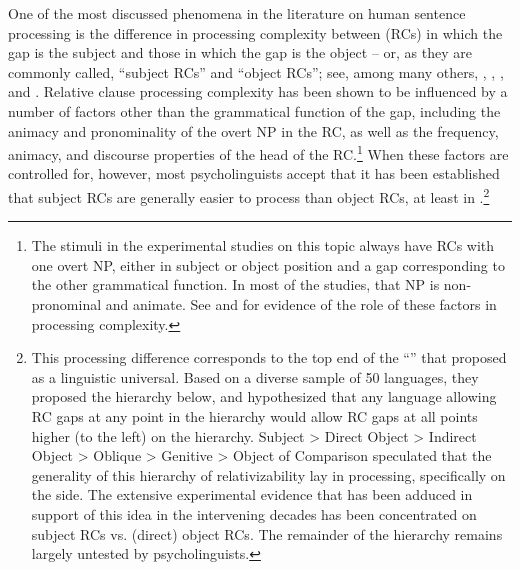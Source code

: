 \documentclass[output=paper
 	        ,biblatex
                ,babelshorthands
                ,newtxmath
                ,draftmode
                ,colorlinks, citecolor=brown
]{langscibook}
\begin{document}
One of the most discussed phenomena in the literature on human sentence processing is the difference in processing complexity between  (RCs) in which the gap is the subject and those in which the gap is the object -- or, as they are commonly called, ``subject RCs'' and ``object RCs''; see, among many others, \citet{WannerMaratsos78}, \citet{Gibson98a}, \citet{TraxlerEtal2002}, and \citet{GennariMacDonald2008}.  Relative clause processing complexity has been shown to be influenced by a number of factors other than the grammatical function of the gap, including the animacy and pronominality of the overt NP in the RC, as well as the frequency, animacy, and discourse properties of the head of the RC.\footnote{The stimuli in the experimental studies on this topic always have RCs with one overt NP, either in subject or object position and a gap corresponding to the other grammatical function. In most of the studies, that NP is non-pronominal and animate.  See \citet{RealiChristiansen07} and \citet{RolandEtal2012} for evidence of the role of these factors in processing complexity.} When these factors are controlled for, however, most psycholinguists accept that it has been established that subject RCs are generally easier to process than object RCs, at least in .\footnote{This processing difference corresponds to the top end of the ``'' that \citet{KC77a} proposed as a linguistic universal. Based on a diverse sample of 50 languages, they proposed the hierarchy below, and hypothesized that any language allowing RC gaps at any point in the hierarchy would allow RC gaps at all points higher (to the left) on the hierarchy.
\ea
Subject 
> 
Direct Object 
> 
Indirect Object 
> 
Oblique 
> 
Genitive
> 
Object of Comparison
\z
\citeauthor{KC77a} speculated that the generality of this hierarchy of relativizability lay in processing, specifically on the  side.  The extensive experimental evidence that has been adduced in support of this idea in the intervening decades has been concentrated on subject RCs vs. (direct) object RCs.  The remainder of the hierarchy remains largely untested by psycholinguists.}
\end{document}
